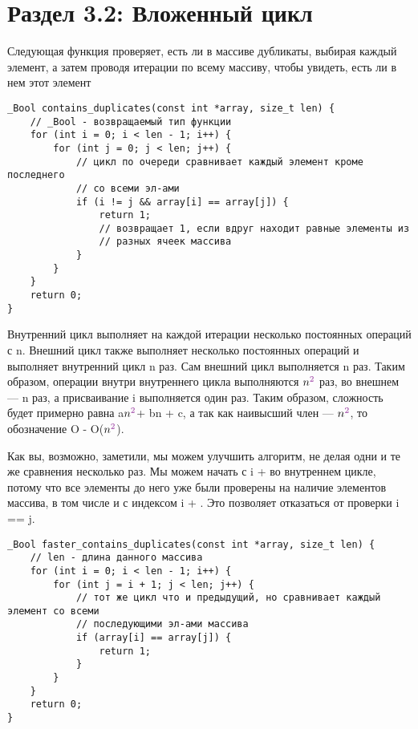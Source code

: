 \vspace{\baselineskip}

\section*{Раздел 3.2: Вложенный цикл}

\vspace{\baselineskip}
Следующая функция проверяет, есть ли в массиве дубликаты, выбирая каждый элемент, а затем проводя итерации по всему массиву, чтобы увидеть, есть ли в нем этот элемент

\vspace{\baselineskip}
\begin{tcolorbox}
\begin{verbatim}
_Bool contains_duplicates(const int *array, size_t len) {
	// _Bool - возвращаемый тип функции
	for (int i = 0; i < len - 1; i++) {
		for (int j = 0; j < len; j++) {
			// цикл по очереди сравнивает каждый элемент кроме последнего 
			// со всеми эл-ами
			if (i != j && array[i] == array[j]) {
				return 1;
				// возвращает 1, если вдруг находит равные элементы из
				// разных ячеек массива
			}
		}
	}
	return 0;
}

\end{verbatim}
\end{tcolorbox}

\vspace{\baselineskip}
Внутренний цикл выполняет на каждой итерации несколько постоянных операций с n. Внешний цикл также выполняет несколько постоянных операций и выполняет внутренний цикл n раз. Сам внешний цикл выполняется n раз. Таким образом, операции внутри внутреннего цикла выполняются $n^{\p{2}}$ раз, во внешнем --- n раз, а присваивание i выполняется один раз. Таким образом, сложность будет примерно равна a$n^{\p{2}}$+ bn + c, а так как наивысший член --- $n^{\p{2}}$, то обозначение O - O($n^{\p{2}}$). 

\vspace{\baselineskip}
Как вы, возможно, заметили, мы можем улучшить алгоритм, не делая одни и те же сравнения несколько раз. Мы можем начать с i +  во внутреннем цикле, потому что все элементы до него уже были проверены на наличие элементов массива, в том числе и с индексом i + . Это позволяет отказаться от проверки i == j.

\vspace{\baselineskip}
\begin{tcolorbox}
\begin{verbatim}
_Bool faster_contains_duplicates(const int *array, size_t len) {
	// len - длина данного массива
	for (int i = 0; i < len - 1; i++) {
		for (int j = i + 1; j < len; j++) {
			// тот же цикл что и предыдущий, но сравнивает каждый элемент со всеми
			// последующими эл-ами массива
			if (array[i] == array[j]) {
				return 1;
			}
		}
	}
	return 0;
}

\end{verbatim}
\end{tcolorbox}

